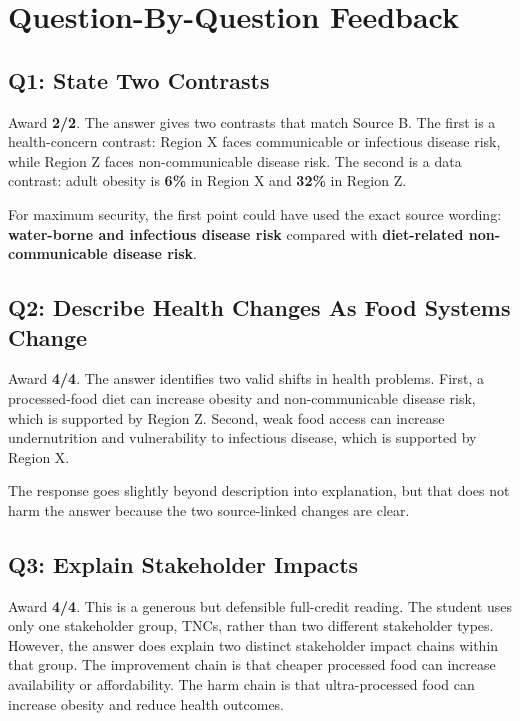 \documentclass[11pt,a4paper]{article}
\newcommand{\term}[1]{\textcolor{HeadingBlue}{\textbf{#1}}}
\newcommand{\score}[1]{\textcolor{AccentTeal}{\textbf{#1}}}
\begin{document}
\section{Question-By-Question Feedback}

\subsection{Q1: State Two Contrasts}

Award \score{2/2}. The answer gives two contrasts that match Source B. The
first is a health-concern contrast: Region X faces communicable or infectious
disease risk, while Region Z faces non-communicable disease risk. The second is
a data contrast: adult obesity is \term{6\%} in Region X and \term{32\%} in
Region Z.

For maximum security, the first point could have used the exact source wording:
\term{water-borne and infectious disease risk} compared with
\term{diet-related non-communicable disease risk}.

\subsection{Q2: Describe Health Changes As Food Systems Change}

Award \score{4/4}. The answer identifies two valid shifts in health problems.
First, a processed-food diet can increase obesity and non-communicable disease
risk, which is supported by Region Z. Second, weak food access can increase
undernutrition and vulnerability to infectious disease, which is supported by
Region X.

The response goes slightly beyond description into explanation, but that does
not harm the answer because the two source-linked changes are clear.

\subsection{Q3: Explain Stakeholder Impacts}

Award \score{4/4}. This is a generous but defensible full-credit reading. The
student uses only one stakeholder group, TNCs, rather than two different
stakeholder types. However, the answer does explain two distinct stakeholder
impact chains within that group. The improvement chain is that cheaper
processed food can increase availability or affordability. The harm chain is
that ultra-processed food can increase obesity and reduce health outcomes.
\end{document}
